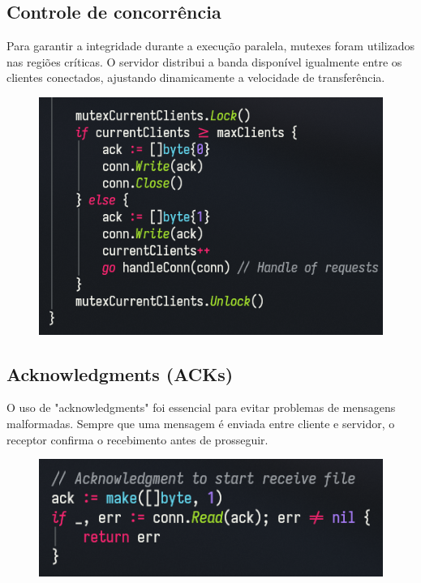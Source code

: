 \documentclass{article}
\begin{document}
\subsection*{Controle de concorrência}
Para garantir a integridade durante a execução paralela, mutexes foram utilizados nas regiões críticas. O servidor distribui a banda disponível
igualmente entre os clientes conectados, ajustando dinamicamente a velocidade de transferência.

\begin{figure}[H]
	\centering
	\includegraphics[scale=0.5]{concorrencia.png}
\end{figure}

\subsection*{Acknowledgments (ACKs)}
O uso de "acknowledgments" foi essencial para evitar problemas de mensagens malformadas. Sempre que uma mensagem é enviada entre cliente e servidor,
o receptor confirma o recebimento antes de prosseguir.

\begin{figure}[H]
	\centering
	\includegraphics{acks.png}
\end{figure}
\end{document}
